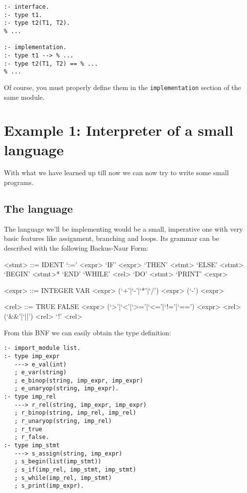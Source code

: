 \begin{lstlisting}[language=Mercury]
:- interface.
:- type t1.
:- type t2(T1, T2).
% ...

:- implementation.
:- type t1 --> % ...
:- type t2(T1, T2) == % ...
% ...
\end{lstlisting}

Of course, you must properly define them in the \texttt{implementation} section of the same module.

\section{Example 1: Interpreter of a small language}

With what we have learned up till now we can now try to write some small programs.

\subsection{The language}

The language we'll be implementing would be a small, imperative one with very basic features like assignment, branching and loops. Its grammar can be described with the following Backus-Naur Form:

\begin{grammar}
  <stmt> ::= IDENT `:=' <expr>
  \alt `IF' <expr> `THEN' <stmt> `ELSE' <stmt>
  \alt `BEGIN' <stmt>* `END'
  \alt `WHILE' <rel> `DO' <stmt>
  \alt `PRINT' <expr>

  <expr> ::= INTEGER
  \alt VAR
  \alt <expr> (`+'|`-'|`*'|`/') <expr>
  \alt (`-') <expr>

  <rel> ::= TRUE
  \alt FALSE
  \alt <expr> (`>'|`<'|`>='|`<='|`!='|`==') <expr>
  \alt <rel> (`\&\&'|`||') <rel>
  \alt `!' <rel>
\end{grammar}

From this BNF we can easily obtain the type definition:

\begin{lstlisting}[language=Mercury]
:- import_module list.
:- type imp_expr
   ---> e_val(int)
   ; e_var(string)
   ; e_binop(string, imp_expr, imp_expr)
   ; e_unaryop(string, imp_expr).
:- type imp_rel
   ---> r_rel(string, imp_expr, imp_expr)
   ; r_binop(string, imp_rel, imp_rel)
   ; r_unaryop(string, imp_rel)
   ; r_true
   ; r_false.
:- type imp_stmt
   ---> s_assign(string, imp_expr)
   ; s_begin(list(imp_stmt))
   ; s_if(imp_rel, imp_stmt, imp_stmt)
   ; s_while(imp_rel, imp_stmt)
   ; s_print(imp_expr).
\end{lstlisting}

